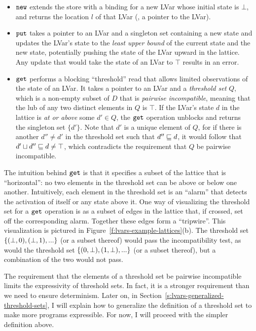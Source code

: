 \begin{itemize}
\item $\mbox{\texttt{new}}$ extends the store with a binding for a new LVar whose
  initial state is $\bot$, and returns the location $l$ of that LVar
  (\ie, a pointer to the LVar).
\item $\mbox{\texttt{put}}$ takes a pointer to an LVar and a singleton set containing
  a new state and updates the LVar's state to the {\em least upper
  bound} of the current state and the new state, potentially pushing
  the state of the LVar upward in the lattice.  Any update that would
  take the state of an LVar to $\top$ results in an error.
\item $\mbox{\texttt{get}}$ performs a blocking ``threshold'' read that allows
  limited observations of the state of an LVar.  It takes a pointer to
  an LVar and a \emph{threshold set} $Q$, which is a non-empty subset
  of $D$ that is \emph{pairwise incompatible}, meaning that the lub of
  any two distinct elements in $Q$ is $\top$.  If the LVar's state $d$
  in the lattice is {\em at or above} some $d' \in Q$, the $\mbox{\texttt{get}}$
  operation unblocks and returns the singleton set $\lbrace
  d' \rbrace$.  Note that $d'$ is a unique element of $Q$, for if
  there is another $d'' \neq d'$ in the threshold set such that
  $d'' \sqsubseteq d$, it would follow that $d' \sqcup d'' \sqsubseteq
  d \neq \top$, which contradicts the requirement that $Q$ be pairwise
  incompatible.
\end{itemize}

The intuition behind $\mbox{\texttt{get}}$ is that it specifies a subset of the
lattice that is ``horizontal'': no two elements in the threshold set
can be above or below one another.  Intuitively, each element in the
threshold set is an ``alarm'' that detects the activation of itself or
any state above it.  One way of visualizing the threshold set for a
$\mbox{\texttt{get}}$ operation is as a subset of edges in the lattice that, if
crossed, set off the corresponding alarm.  Together these edges form a
``tripwire''.  This visualization is pictured in
Figure~\ref{f:lvars-example-lattices}(b).  The threshold set
$\lbrace (\bot, 0), (\bot, 1), ... \rbrace$ (or a subset thereof) would
pass the incompatibility test, as would the threshold set
$\lbrace (0, \bot), (1, \bot), ... \rbrace$ (or a subset thereof), but a
combination of the two would not pass.

The requirement that the elements of a threshold set be pairwise
incompatible limits the expressivity of threshold sets.  In fact, it
is a stronger requirement than we need to ensure determinism.  Later
on, in Section~\ref{s:lvars-generalized-threshold-sets}, I will
explain how to generalize the definition of a threshold set to make
more programs expressible.  For now, I will proceed with the simpler
definition above.

